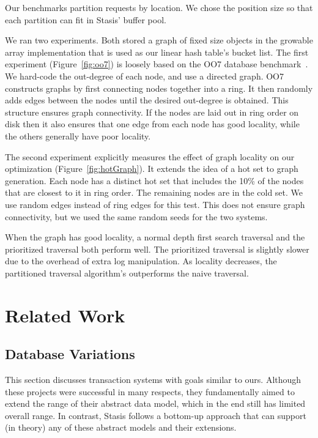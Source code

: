 \documentclass[letterpaper,twocolumn,10pt]{article}
\newcommand{\yad}{Stasis\xspace}
\newcommand{\yads}{Stasis'\xspace}
\begin{document}
Our benchmarks partition requests by location.  We chose the
position size so that each partition can fit in \yads buffer pool.

We ran two experiments.  Both stored a graph of fixed size objects in
the growable array implementation that is used as our linear
hash table's bucket list.
The first experiment (Figure~\ref{fig:oo7})
is loosely based on the OO7 database benchmark~\cite{oo7}.  We
hard-code the out-degree of each node, and use a directed graph.  OO7
constructs graphs by first connecting nodes together into a ring.
It then randomly adds edges between the nodes until the desired
out-degree is obtained.  This structure ensures graph connectivity.
If the nodes are laid out in ring order on disk then it also ensures that
one edge from each node has good locality, while the others generally
have poor locality.

The second experiment explicitly measures the effect of graph locality
on our optimization (Figure~\ref{fig:hotGraph}). It extends the idea
of a hot set to graph generation.  Each node has a distinct hot set
that includes the 10\% of the nodes that are closest to it in ring
order.  The remaining nodes are in the cold set.  We use random edges
instead of ring edges for this test.  This does not ensure graph
connectivity, but we used the same random seeds for the two systems.

When the graph has good locality, a normal depth first search
traversal and the prioritized traversal both perform well.  The
prioritized traversal is slightly slower due to the overhead of extra
log manipulation. As locality decreases, the partitioned traversal
algorithm's outperforms the naive traversal.


\section{Related Work}
\label{related-work}

\subsection{Database Variations} 
\label{sec:otherDBs}

This section discusses transaction systems with goals
similar to ours.  Although these projects were successful in many
respects, they fundamentally aimed to extend the range of their
abstract data model, which in the end still has limited overall range.
In contrast, \yad follows a bottom-up approach that can support (in 
theory) any of these abstract models and their extensions.
\end{document}
